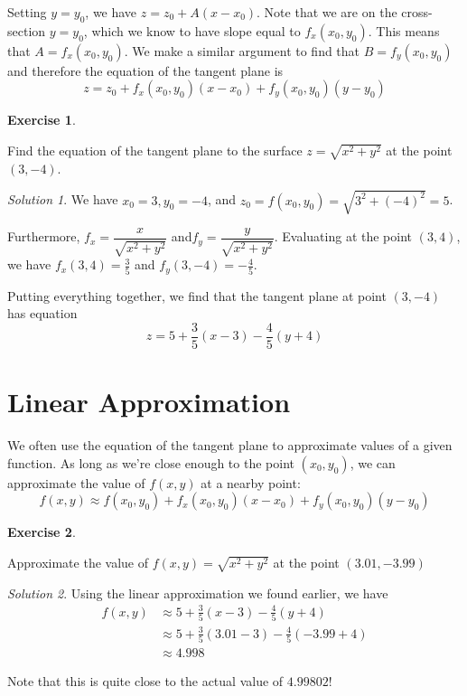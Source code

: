 \documentclass[
]{book}
\theoremstyle{definition}
\theoremstyle{definition}
\theoremstyle{definition}
\newtheorem{exercise}{Exercise}[chapter]
\theoremstyle{definition}
\theoremstyle{remark}
\newtheorem*{solution}{Solution}
\begin{document}
Setting \(y=y_0\), we have \(z=z_0+A(x-x_0)\). Note that we are on the cross-section \(y=y_0\), which we know to have slope equal to \(f_x(x_0, y_0)\). This means that \(A=f_x(x_0,y_0)\). We make a similar argument to find that \(B=f_y(x_0,y_0)\) and therefore the equation of the tangent plane is \[z=z_0+f_x(x_0, y_0)(x-x_0)+f_y(x_0, y_0)(y-y_0)\]

\begin{exercise}
\protect\hypertarget{exr:unlabeled-div-24}{}\label{exr:unlabeled-div-24}

Find the equation of the tangent plane to the surface \(z=\sqrt{x^2+y^2}\) at the point \((3, -4)\).

\end{exercise}

\begin{solution}

We have \(x_0=3, y_0=-4\), and \(z_0=f(x_0,y_0)=\sqrt{3^2+(-4)^2}=5\).

Furthermore, \(f_x = \dfrac{x}{\sqrt{x^2+y^2}}\) and\(f_y = \dfrac{y}{\sqrt{x^2+y^2}}\). Evaluating at the point \((3, 4)\), we have \(f_x(3,4)=\frac{3}{5}\) and \(f_y(3, -4)=-\frac{4}{5}\).

Putting everything together, we find that the tangent plane at point \((3,-4)\) has equation \[z=5+\frac{3}{5}(x-3)-\frac{4}{5}(y+4)\]

\end{solution}

\hypertarget{linear-approximation}{%
\section{Linear Approximation}\label{linear-approximation}}

We often use the equation of the tangent plane to approximate values of a given function. As long as we're close enough to the point \((x_0, y_0)\), we can approximate the value of \(f(x,y)\) at a nearby point: \[f(x,y)\approx f(x_0,y_0)+f_x(x_0, y_0)(x-x_0)+f_y(x_0, y_0)(y-y_0)\]

\begin{exercise}
\protect\hypertarget{exr:unlabeled-div-26}{}\label{exr:unlabeled-div-26}

Approximate the value of \(f(x,y)=\sqrt{x^2+y^2}\) at the point \((3.01, -3.99)\)

\end{exercise}

\begin{solution}

Using the linear approximation we found earlier, we have
\begin{align*}
f(x,y) & \approx 5+\frac{3}{5}(x-3)-\frac{4}{5}(y+4) \\
& \approx 5+\frac{3}{5}(3.01-3)-\frac{4}{5}(-3.99+4)\\
& \approx 4.998
\end{align*}

Note that this is quite close to the actual value of \(4.99802\)!

\end{solution}
\end{document}

